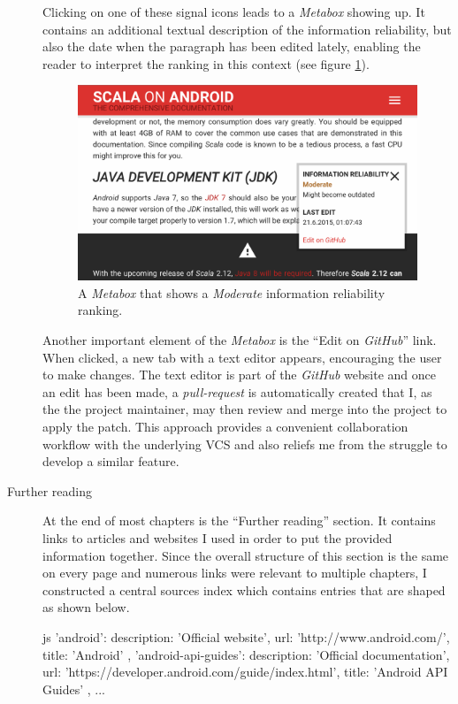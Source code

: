 \begin{description}
	Clicking on one of these signal icons leads to a \textit{Metabox} showing up. It contains an additional textual description of the information reliability, but also the date when the paragraph has been edited lately, enabling the reader to interpret the ranking in this context (see figure \ref{metabox}).

	\begin{figure}[]
		\includegraphics[width=\textwidth]{asset/metabox.png}
		\caption{A \textit{Metabox} that shows a \textit{Moderate} information reliability ranking.}
		\label{metabox}
	\end{figure}

	Another important element of the \textit{Metabox} is the \enquote{Edit on \textit{GitHub}} link. When clicked, a new tab with a text editor appears, encouraging the user to make changes. The text editor is part of the \textit{GitHub} website and once an edit has been made, a \textit{pull-request} is automatically created that I, as the the project maintainer, may then review and merge into the project to apply the patch. This approach provides a convenient collaboration workflow with the underlying \ac{VCS} and also reliefs me from the struggle to develop a similar feature.

	\item[Further reading]\hfill

	At the end of most chapters is the \enquote{Further reading} section. It contains links to articles and websites I used in order to put the provided information together. Since the overall structure of this section is the same on every page and numerous links were relevant to multiple chapters, I constructed a central sources index which contains entries that are shaped as shown below.

	\begin{code}{js}
'android':
{
	description: 'Official website',
	url: 'http://www.android.com/',
	title: 'Android'
},
'android-api-guides':
{
	description: 'Official documentation',
	url: 'https://developer.android.com/guide/index.html',
	title: 'Android API Guides'
},
...
	\end{code}


\end{description}
